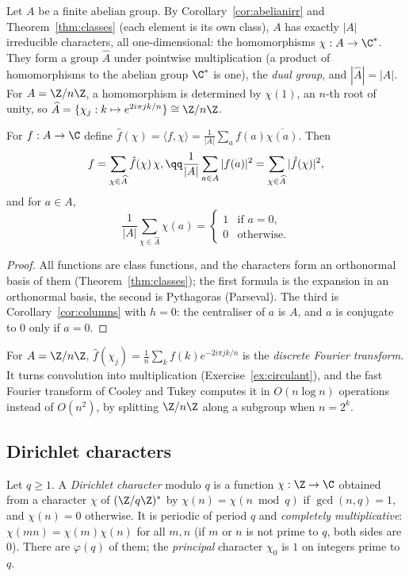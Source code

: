 Let $A$ be a finite abelian group. By Corollary~\ref{cor:abelianirr} and Theorem~\ref{thm:classes} (each element is its own class), $A$ has exactly $|A|$ irreducible characters, all one-dimensional: the homomorphisms $\chi:A\to\C^*$. They form a group $\widehat A$ under pointwise multiplication (a product of homomorphisms to the abelian group $\C^*$ is one), the \emph{dual group}, and $|\widehat A|=|A|$. For $A=\Z/n\Z$, a homomorphism is determined by $\chi(1)$, an $n$-th root of unity, so $\widehat A=\{\chi_j:k\mapsto e^{2i\pi jk/n}\}\cong\Z/n\Z$.

\begin{theorem}\label{thm:fourier}
For $f:A\to\C$ define $\hat f(\chi)=\langle f,\chi\rangle=\frac1{|A|}\sum_{a}f(a)\overline{\chi(a)}$. Then
\[
\begin{gathered}f=\sum_{\chi\in\widehat A}\hat f(\chi)\,\chi,\qq\frac1{|A|}\sum_{a\in A}|f(a)|^2=\sum_{\chi\in\widehat A}|\hat f(\chi)|^2,\end{gathered}
\]
and for $a\in A$,
\[
\frac1{|A|}\sum_{\chi\in\widehat A}\chi(a)=\begin{cases}1&\text{if }a=0,\\0&\text{otherwise.}\end{cases}
\]
\end{theorem}
\begin{proof}
All functions are class functions, and the characters form an orthonormal basis of them (Theorem~\ref{thm:classes}); the first formula is the expansion in an orthonormal basis, the second is Pythagoras (Parseval). The third is Corollary~\ref{cor:columns} with $h=0$: the centraliser of $a$ is $A$, and $a$ is conjugate to $0$ only if $a=0$.
\end{proof}

For $A=\Z/n\Z$, $\hat f(\chi_j)=\frac1n\sum_kf(k)e^{-2i\pi jk/n}$ is the \emph{discrete Fourier transform}. It turns convolution into multiplication (Exercise~\ref{ex:circulant}), and the fast Fourier transform of Cooley and Tukey computes it in $O(n\log n)$ operations instead of $O(n^2)$, by splitting $\Z/n\Z$ along a subgroup when $n=2^k$.

\subsection*{Dirichlet characters}

Let $q\ge1$. A \emph{Dirichlet character} modulo $q$ is a function $\chi:\Z\to\C$ obtained from a character $\chi$ of $(\Z/q\Z)^*$ by $\chi(n)=\chi(n\bmod q)$ if $\gcd(n,q)=1$, and $\chi(n)=0$ otherwise. It is periodic of period $q$ and \emph{completely multiplicative}: $\chi(mn)=\chi(m)\chi(n)$ for all $m,n$ (if $m$ or $n$ is not prime to $q$, both sides are $0$). There are $\varphi(q)$ of them; the \emph{principal} character $\chi_0$ is $1$ on integers prime to $q$.

